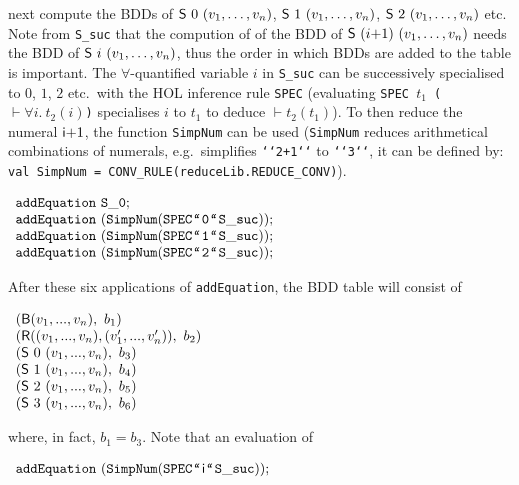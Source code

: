 \documentclass[12pt]{article}
\newcommand{\con}[1]{\mbox{\sf #1}}
\newcommand{\ml}[1]{{\tt #1}}
\newcommand{\qq}[1]{\mbox{\tt{`\hspace{-1.3mm}`}}#1\mbox{\tt{`\hspace{-1.3mm}`}}}
\newcommand\HOL{HOL\xspace}
\begin{document}
\noindent next compute the BDDs of
$\con{S}~0~(v_1,\ldots,v_n)$,  $\con{S}~1~(v_1,\ldots,v_n)$, $\con{S}~2~(v_1,\ldots,v_n)$ etc.
Note from \ml{S\_suc} that the compution of of the BDD of $\con{S}~(i{+}1)~(v_1,\ldots,v_n)$
needs the BDD of $\con{S}~i~(v_1,\ldots,v_n)$, thus the order in which BDDs are added to the
table is important. The $\forall$-quantified variable $i$ in \ml{S\_suc} can be successively
specialised to $0$, $1$, $2$ etc.~with
the \HOL{} inference rule \ml{SPEC} (evaluating
\ml{SPEC~$t_1$~(\hspace{0.5mm}$\vdash \forall i.~t_2(i)$)} specialises $i$
to $t_1$ to deduce
$\vdash t_2(t_1)$). To then reduce the numeral $\con{i}{+}1$, the function
\ml{SimpNum} can be  used (\ml{SimpNum} reduces arithmetical combinations of
numerals, e.g.~simplifies \ml{\qq{2+1}} to \ml{\qq{3}},
it can be defined by:
{\verb+val SimpNum = CONV_RULE(reduceLib.REDUCE_CONV)+}).


\smallskip

$\begin{array}{ll}
\ml{addEquation~S\_0};\\
\ml{addEquation~(SimpNum(SPEC \qq{0} S\_suc))};\\
\ml{addEquation~(SimpNum(SPEC \qq{1} S\_suc))};\\
\ml{addEquation~(SimpNum(SPEC \qq{2} S\_suc))};\\
\end{array}$

\smallskip

\noindent After these
six applications of \ml{addEquation}, the BDD table will consist of

\smallskip

$\begin{array}{l}
(\con{B}(v_1,...,v_n),~b_1)\\
(\con{R}((v_1,...,v_n),(v'_1,...,v'_n)),~b_2)\\
(\con{S}~0~(v_1,...,v_n),~b_3)\\
(\con{S}~1~(v_1,...,v_n),~b_4)\\
(\con{S}~2~(v_1,...,v_n),~b_5)\\
(\con{S}~3~(v_1,...,v_n),~b_6)
\end{array}$

\smallskip

\noindent where, in fact, $b_1=b_3$. Note that an evaluation of  


\smallskip

$\begin{array}{l}
\ml{addEquation~(SimpNum(SPEC \qq{\con{i}} S\_suc))};\\
\end{array}$
\end{document}

